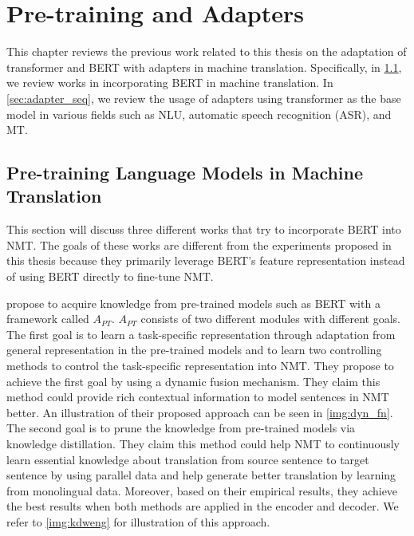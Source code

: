 \chapter{Pre-training and Adapters}

This chapter reviews the previous work related to this thesis on the adaptation of transformer and BERT with adapters in machine translation. Specifically, in \cref{sec:prelm_mt}, we review works in incorporating BERT in machine translation. In \cref{sec:adapter_seq}, we review the usage of adapters using transformer as the base model in various fields such as NLU, automatic speech recognition (ASR), and MT.

\section{Pre-training Language Models in Machine Translation}
\label{sec:prelm_mt}

This section will discuss three different works that try to incorporate BERT into NMT. The goals of these works are different from the experiments proposed in this thesis because they primarily leverage BERT's feature representation instead of using BERT directly to fine-tune NMT.

 propose to acquire knowledge from pre-trained models such as BERT with a framework called $A_{PT}$. $A_{PT}$ consists of two different modules with different goals. The first goal is to learn a task-specific representation through adaptation from general representation in the pre-trained models and to learn two controlling methods to control the task-specific representation into NMT. They propose to achieve the first goal by using a dynamic fusion mechanism. They claim this method could provide rich contextual information to model sentences in NMT better. An illustration of their proposed approach can be seen in \cref{img:dyn_fn}. The second goal is to prune the knowledge from pre-trained models via knowledge distillation. They claim this method could help NMT to continuously learn essential knowledge about translation from source sentence to target sentence by using parallel data and help generate better translation by learning from monolingual data. Moreover, based on their empirical results, they achieve the best results when both methods are applied in the encoder and decoder. We refer to \cref{img:kdweng} for illustration of this approach.

